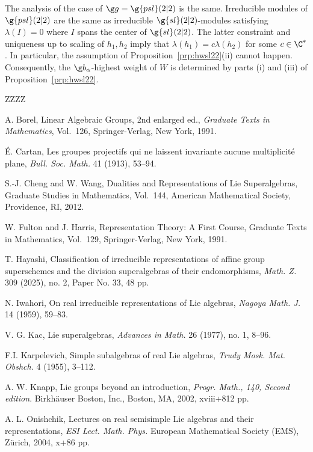 \documentclass[12pt]{amsart}
\begin{document}
The analysis of the case of $\g g=\g{psl}(2|2)$
is the same. 
Irreducible modules of  $\g{psl}(2|2)$ are the same as irreducible $\g{sl}(2|2)$-modules satisfying $\lambda(I)=0$ where $I$ spans the center of $\g{sl}(2|2)$. The latter constraint and uniqueness up to scaling of $h_1,h_2$  imply that $\lambda(h_1)=c\lambda(h_2)$ for some $c\in\C^*$. In particular, 
the assumption of Proposition~\ref{prp:hwsl22}(ii) cannot happen. Consequently,  the $\g b_\alpha$-highest weight of $W$ is determined by parts (i) and (iii) of Proposition~\ref{prp:hwsl22}.
\begin{thebibliography}{ZZZZ}


A. Borel,
Linear Algebraic Groups,
2nd enlarged ed.,
\emph{Graduate Texts in Mathematics}, Vol.~126,
Springer-Verlag, New York, 1991.


\'{E}. Cartan, Les groupes projectifs qui ne laissent invariante aucune multiplicité plane, \emph{Bull.
Soc. Math.} 41 (1913), 53--94.


S.-J. Cheng and W. Wang,
Dualities and Representations of Lie Superalgebras,
Graduate Studies in Mathematics, Vol.~144,
American Mathematical Society, Providence, RI, 2012.


W. Fulton and J. Harris,
Representation Theory: A First Course,
Graduate Texts in Mathematics, Vol.~129,
Springer-Verlag, New York, 1991.

T. Hayashi, Classification of irreducible representations of affine group superschemes and the division superalgebras of their endomorphisms,
\emph{Math. Z.} 309 (2025), no. 2, Paper No. 33, 48 pp.


N. Iwahori, On real irreducible representations of Lie algebras, \emph{Nagoya Math. J.} 14 (1959),
59--83.



V. G. Kac, Lie superalgebras, 
\emph{Advances in Math.} 26 (1977), no. 1, 8--96.

F.I. Karpelevich, Simple subalgebras of real Lie algebras, \emph{Trudy Mosk. Mat. Obshch.} 4
(1955), 3--112. 



 A. W. Knapp, 
Lie groups beyond an introduction,
\emph{Progr. Math., 140, Second edition}.
Birkh\"{a}user Boston, Inc., Boston, MA, 2002, xviii+812 pp.


A. L. Onishchik, 
Lectures on real semisimple Lie algebras and their representations,
\emph{ESI Lect. Math. Phys.}
European Mathematical Society (EMS), Zürich, 2004, x+86 pp.




\end{thebibliography}
\end{document}
